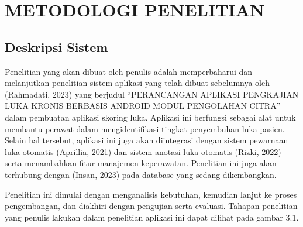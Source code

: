 
\chapter{METODOLOGI PENELITIAN}

\section{Deskripsi Sistem}

Penelitian yang akan dibuat oleh penulis adalah memperbaharui dan melanjutkan penelitian sistem aplikasi yang telah dibuat sebelumnya oleh (Rahmadati, 2023) yang berjudul “PERANCANGAN APLIKASI PENGKAJIAN LUKA KRONIS BERBASIS ANDROID MODUL PENGOLAHAN CITRA” dalam pembuatan aplikasi skoring luka. Aplikasi ini berfungsi sebagai alat untuk membantu perawat dalam mengidentifikasi tingkat penyembuhan luka pasien. Selain hal tersebut, aplikasi ini juga akan diintegrasi dengan sistem pewarnaan luka otomatis (Aprillia, 2021) dan sistem anotasi luka otomatis (Rizki, 2022) serta menambahkan fitur manajemen keperawatan. Penelitian ini juga akan terhubung dengan (Insan, 2023) pada database yang sedang dikembangkan.

Penelitian ini dimulai dengan menganalisis kebutuhan, kemudian lanjut ke proses pengembangan, dan diakhiri dengan pengujian serta evaluasi. Tahapan penelitian yang penulis lakukan dalam penelitian aplikasi ini dapat dilihat pada gambar 3.1.


